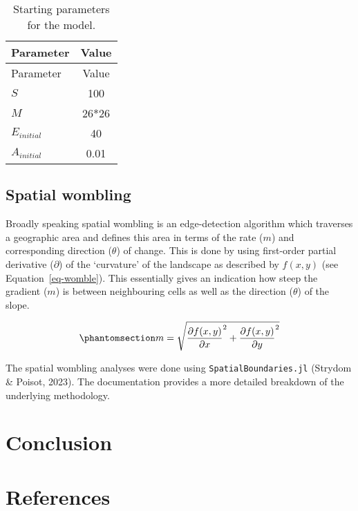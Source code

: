 \documentclass[
]{agujournal2019}
\begin{document}
\begin{longtable}[]{@{}lc@{}}
\caption{Starting parameters for the
model.}\label{tbl-model_params}\tabularnewline
\toprule\noalign{}
Parameter & Value \\
\midrule\noalign{}
\endfirsthead
\toprule\noalign{}
Parameter & Value \\
\midrule\noalign{}
\endhead
\bottomrule\noalign{}
\endlastfoot
\(S\) & 100 \\
\(M\) & 26*26 \\
\(E_{initial}\) & 40 \\
\(A_{initial}\) & 0.01 \\
\end{longtable}

\subsection{Spatial wombling}\label{spatial-wombling}

Broadly speaking spatial wombling is an edge-detection algorithm which
traverses a geographic area and defines this area in terms of the rate
(\(m\)) and corresponding direction (\(\theta\)) of change. This is done
by using first-order partial derivative (\(\partial\)) of the
`curvature' of the landscape as described by \(f(x,y)\) (see
Equation~\ref{eq-womble}). This essentially gives an indication how
steep the gradient (\(m\)) is between neighbouring cells as well as the
direction (\(\theta\)) of the slope.

\begin{equation}\phantomsection\label{eq-womble}{
m = \sqrt{\frac{\partial f(x,y)}{\partial x}^2 + \frac{\partial f(x,y)}{\partial y}^2}
}\end{equation}

The spatial wombling analyses were done using
\texttt{SpatialBoundaries.jl} (Strydom \& Poisot, 2023). The
documentation provides a more detailed breakdown of the underlying
methodology.

\section{Conclusion}\label{conclusion}

\section*{References}\label{references}

\vspace{1em}
\end{document}
